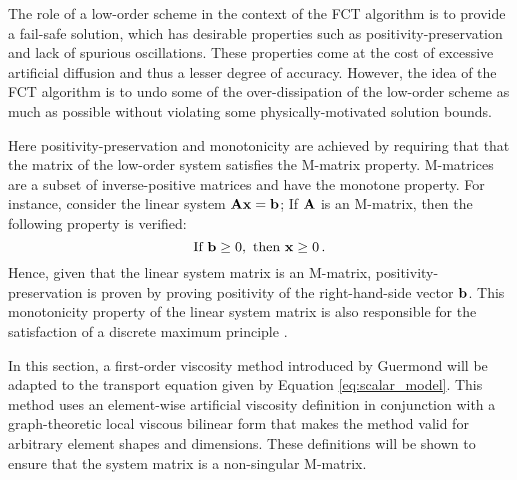 
The role of a low-order scheme in the context of the FCT algorithm is to
provide a fail-safe solution, which has desirable properties such as
positivity-preservation and lack of spurious oscillations. These properties
come at the cost of excessive artificial diffusion and thus a lesser degree
of accuracy. However, the idea of the FCT algorithm is to undo some of the over-dissipation
of the low-order scheme as much as possible without violating some physically-motivated solution bounds.

Here positivity-preservation and monotonicity are achieved by
requiring that that the matrix of the low-order system satisfies the M-matrix property.
M-matrices are a subset of inverse-positive matrices and have the monotone
property. For instance, consider the linear system $\mathbf{A}\mathbf{x} = \mathbf{b}$;
If $\mathbf{A}$ is an M-matrix, then the following property is verified:
\begin{equation}
\text{If }  \mathbf{b} \geq 0, \text{  then  }  \mathbf{x} \geq 0 \,.
\end{equation}
Hence, given that the linear system matrix is an
M-matrix, positivity-preservation is proven by proving positivity of the right-hand-side vector $\mathbf{b}$.
This monotonicity property of the linear system matrix is also responsible for
the satisfaction of a discrete maximum principle \cite{guermond_firstorder}.

In this section, a first-order viscosity method introduced by Guermond
\cite{guermond_firstorder} will be adapted to the transport equation given by
Equation \eqref{eq:scalar_model}. This method uses an element-wise artificial
viscosity definition in conjunction with a graph-theoretic local viscous
bilinear form that makes the method valid for arbitrary element shapes and
dimensions. These definitions will be shown to ensure that the system matrix
is a non-singular M-matrix.

